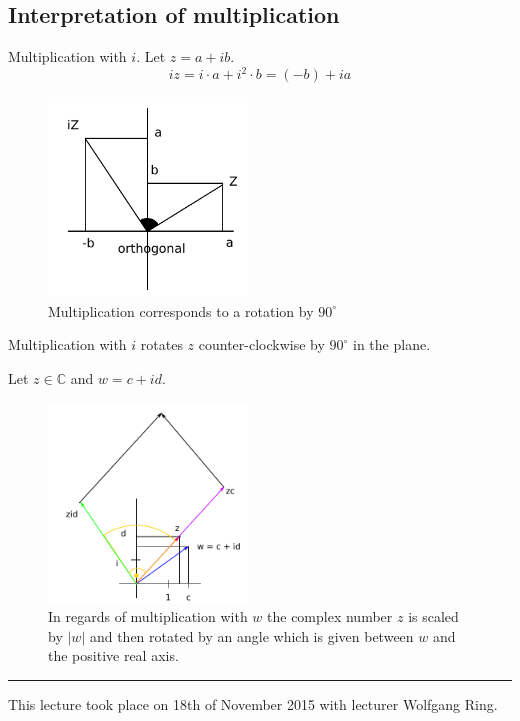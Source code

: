 \documentclass[a4paper,landscape,twocolumn]{article}
\newcommand\abs[1]{\left|#1\right|}
\newcommand\meta[3]{\hrule{} This #1 took place on #2 with lecturer #3.\par}
\begin{document}
\subsection{Interpretation of multiplication}
%
Multiplication with $i$. Let $z = a + ib$.
\[ iz = i\cdot a + i^2 \cdot b = (-b) + i a \]

\begin{figure}[!h]
  \begin{center}
    \includegraphics[width=200px]{img/complex_number_multiplication.pdf}
    \caption{Multiplication corresponds to a rotation by $90^\circ$}
  \end{center}
\end{figure}

Multiplication with $i$ rotates $z$ counter-clockwise by $90^\circ$
in the plane.

Let $z \in \mathbb C$ and $w = c + id$.

\begin{figure}[!h]
  \begin{center}
    \includegraphics[width=200px]{img/complex_numbers_multiplication_with_b.pdf}
    \caption{
      In regards of multiplication with $w$ the complex number $z$ is scaled by $\abs{w}$
      and then rotated by an angle which is given between $w$ and the positive real axis.
    }
  \end{center}
\end{figure}

\meta{lecture}{18th of November 2015}{Wolfgang Ring}
\end{document}
